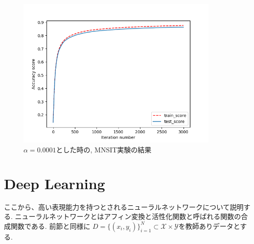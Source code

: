 \documentclass[11pt, a4paper, dvipdfmx]{jsarticle}
\theoremstyle{definition}
\newcommand{\X}{\mathcal{X}}
\newcommand{\Y}{\mathcal{Y}}
\begin{document}
\begin{figure}[H]
    \centering
    \includegraphics[width = 10.0cm]{Images/Logistic_Regression_MNIST.png}
    \caption{$\alpha = 0.0001$とした時の, MNSIT実験の結果}
\end{figure}
\section{Deep Learning}
ここから、高い表現能力を持つとされるニューラルネットワークについて説明する. 
ニューラルネットワークとはアフィン変換と活性化関数と呼ばれる関数の合成関数である. 前節と同様に
$D = \{(x_i, y_i)\}_{i = 1}^{N}\subset\X\times\Y$を教師ありデータとする.
\end{document}
